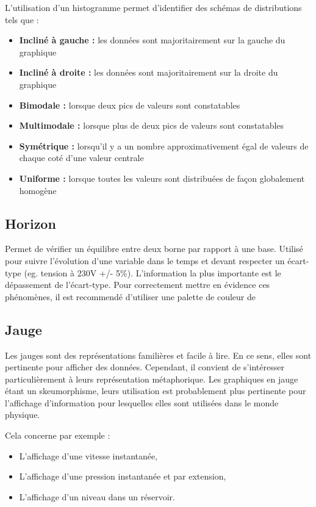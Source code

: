 \documentclass[a4paper,12pt]{article}
\begin{document}
\begin{multicols}{2}
L'utilisation d'un histogramme permet d'identifier des schémas de distributions tels que : \autocite{jonathanschwabishDistribution2021}
\begin{itemize}
\item \textbf{Incliné à gauche :} les données sont majoritairement sur la gauche du graphique
\item \textbf{Incliné à droite :} les données sont majoritairement sur la droite du graphique
\item \textbf{Bimodale :} lorsque deux pics de valeurs sont constatables
\item \textbf{Multimodale :} lorsque plus de deux pics de valeurs sont constatables
\item \textbf{Symétrique :} lorsqu'il y a un nombre approximativement égal de valeurs de chaque coté d'une valeur centrale
\item \textbf{Uniforme :} lorsque toutes les valeurs sont distribuées de façon globalement homogène
\end{itemize}
\subsection*{Horizon}
\label{sec:org93a1fee}
Permet de vérifier un équilibre entre deux borne par rapport à une base. \autocite{alansmithLexiqueVisuel}  Utilisé pour suivre l'évolution d'une variable dans le temps et devant respecter un écart-type (eg. tension à 230V +/- 5\%). L'information la plus importante est le dépassement de l'écart-type. Pour correctement mettre en évidence ces phénomènes, il est recommendé d'utiliser une palette de couleur de
\subsection*{Jauge}
\label{sec:org2e46d11}
Les jauges sont des représentations familières et facile à lire. \autocite{jonathanschwabishComparingCategories2021} En ce sens, elles sont pertinente pour afficher des données. Cependant, il convient de s'intéresser particulièrement à leurs représentation métaphorique. Les graphiques en jauge étant un skeumorphisme, leurs utilisation est probablement plus pertinente pour l'affichage d'information pour lesquelles elles sont utilisées dans le monde physique.

Cela concerne par exemple :
\begin{itemize}
\item L'affichage d'une vitesse instantanée,
\item L'affichage d'une pression instantanée et par extension,
\item L'affichage d'un niveau dans un réservoir.
\end{itemize}


\end{multicols}
\end{document}
